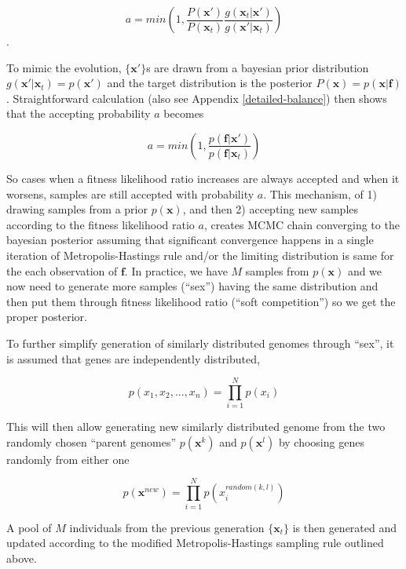 \documentclass{article}
\begin{document}
\begin{equation}
  \label{mcmcsampling1}
  a = min(1, \frac{P(\mathbf{x}')}{P(\mathbf{x}_t)} \frac{g(\mathbf{x}_t|\mathbf{x}')}{g(\mathbf{x}'|\mathbf{x}_t)})
\end{equation}.

To mimic the evolution, $\{\mathbf{x}'\}$s are drawn from a bayesian prior distribution $g(\mathbf{x}'|\mathbf{x}_t) = p(\mathbf{x}')$ and the target distribution is the posterior $P(\mathbf{x}) = p(\mathbf{x}|\mathbf{f})$. Straightforward calculation (also see Appendix \ref{detailed-balance}) then shows that the accepting probability $a$ becomes

\begin{equation}
  \label{mcmcsampling2}
  a = min(1, \frac{p(\mathbf{f}|\mathbf{x}')}{p(\mathbf{f}|\mathbf{x}_t)})
\end{equation}

So cases when a fitness likelihood ratio increases are always accepted and when it worsens, samples are still accepted with probability $a$. This mechanism, of 1) drawing samples from a prior $p(\mathbf{x})$, and then 2) accepting new samples according to the fitness likelihood ratio $a$, creates MCMC chain converging to the bayesian posterior assuming that significant convergence happens in a single iteration of Metropolis-Hastings rule and/or the limiting distribution is same for the each observation of $\mathbf{f}$. In practice, we have $M$ samples from $p(\mathbf{x})$ and we now need to generate more samples (``sex'') having the same distribution and then put them through fitness likelihood ratio (``soft competition'') so we get the proper posterior.
 
To further simplify generation of similarly distributed genomes through ``sex'', it is assumed that genes are independently distributed,

\begin{equation}
  p(x_1,x_2,...,x_n) = \prod_{i=1}^{N}p(x_i)
\end{equation}

This will then allow generating new similarly distributed genome from the two randomly chosen ``parent genomes'' $p(\mathbf{x}^k)$ and $p(\mathbf{x}^l)$ by choosing genes randomly from either one

\begin{equation}
  p(\mathbf{x}^{new}) = \prod_{i=1}^{N}p(x_i^{random(k,l)})
\end{equation}

A pool of $M$ individuals from the previous generation $\{\mathbf{x}_t\}$ is then generated and updated according to the modified Metropolis-Hastings sampling rule outlined above.
\end{document}
